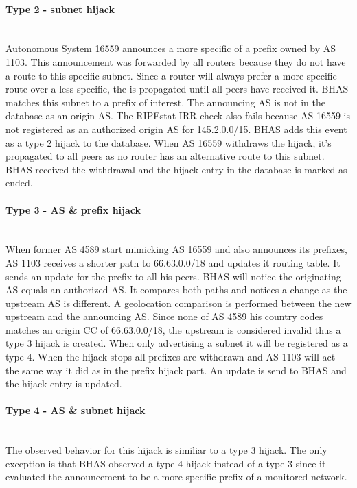 \paragraph{Type 2 - subnet hijack}\mbox{}\\
Autonomous System 16559 announces a more specific of a prefix owned by AS 1103. This announcement was forwarded by all routers because they do not have a route to this specific subnet. Since a router will always prefer a more specific route over a less specific, the is propagated until all peers have received it. BHAS matches this subnet to a prefix of interest. The announcing AS is not in the database as an origin AS. The RIPEstat IRR check also fails because AS 16559 is not registered as an authorized origin AS for 145.2.0.0/15. BHAS adds this event as a type 2 hijack to the database. When AS 16559 withdraws the hijack, it's propagated to all peers as no router has an alternative route to this subnet. BHAS received the withdrawal and the hijack entry in the database is marked as ended.  

\paragraph{Type 3 - AS \& prefix hijack}\mbox{}\\
When former AS 4589 start mimicking AS 16559 and also announces its prefixes, AS 1103 receives a shorter path to 66.63.0.0/18 and updates it routing table. It sends an update for the prefix to all his peers. BHAS will notice the originating AS equals an authorized AS. It compares both paths and notices a change as the upstream AS is different. A geolocation comparison is performed between the new upstream and the announcing AS. Since none of AS 4589 his country codes matches an origin CC of 66.63.0.0/18, the upstream is considered invalid thus a type 3 hijack is created. When only advertising a subnet it will be registered as a type 4. When the hijack stops all prefixes are withdrawn and AS 1103 will act the same way it did as in the prefix hijack part. An update is send to BHAS and the hijack entry is updated.

\paragraph{Type 4 - AS \& subnet hijack}\mbox{}\\
The observed behavior for this hijack is similiar to a type 3 hijack. The only exception is that BHAS observed a type 4 hijack instead of a type 3 since it evaluated the announcement to be a more specific prefix of a monitored network.


